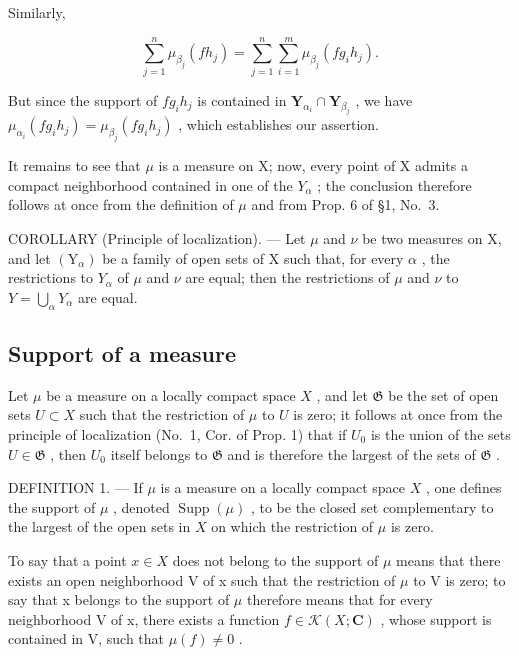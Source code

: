Similarly,

\[
\sum_ {j = 1} ^ {n} \mu_ {\beta_ {j}} (f h _ {j}) = \sum_ {j = 1} ^ {n} \sum_ {i = 1} ^ {m} \mu_ {\beta_ {j}} (f g _ {i} h _ {j}).
\]

But since the support of \(fg_{i}h_{j}\) is contained in \(\mathbf{Y}_{\alpha_i}\cap \mathbf{Y}_{\beta_j}\) , we have \(\mu_{\alpha_i}(fg_i h_j) = \mu_{\beta_j}(fg_i h_j)\) , which establishes our assertion.

It remains to see that \(\mu\) is a measure on X; now, every point of X admits a compact neighborhood contained in one of the \(Y_{\alpha}\) ; the conclusion therefore follows at once from the definition of \(\mu\) and from Prop. 6 of §1, No.~3.

COROLLARY (Principle of localization). --- Let \(\mu\) and \(\nu\) be two measures on X, and let \((\mathrm{Y}_{\alpha})\) be a family of open sets of X such that, for every \(\alpha\) , the restrictions to \(Y_{\alpha}\) of \(\mu\) and \(\nu\) are equal; then the restrictions of \(\mu\) and \(\nu\) to \(Y = \bigcup_{\alpha} Y_{\alpha}\) are equal.

\subsection{Support of a measure}

Let \(\mu\) be a measure on a locally compact space \(X\) , and let \(\mathfrak{G}\) be the set of open sets \(U \subset X\) such that the restriction of \(\mu\) to \(U\) is zero; it follows at once from the principle of localization (No.~1, Cor. of Prop. 1) that if \(U_0\) is the union of the sets \(U \in \mathfrak{G}\) , then \(U_0\) itself belongs to \(\mathfrak{G}\) and is therefore the largest of the sets of \(\mathfrak{G}\) .

DEFINITION 1. --- If \(\mu\) is a measure on a locally compact space \(X\) , one defines the support of \(\mu\) , denoted \(\operatorname{Supp}(\mu)\) , to be the closed set complementary to the largest of the open sets in \(X\) on which the restriction of \(\mu\) is zero.

To say that a point \(x \in X\) does not belong to the support of \(\mu\) means that there exists an open neighborhood V of x such that the restriction of \(\mu\) to V is zero; to say that x belongs to the support of \(\mu\) therefore means that for every neighborhood V of x, there exists a function \(f \in \mathcal{K}(X; \mathbf{C})\) , whose support is contained in V, such that \(\mu(f) \neq 0\) .

